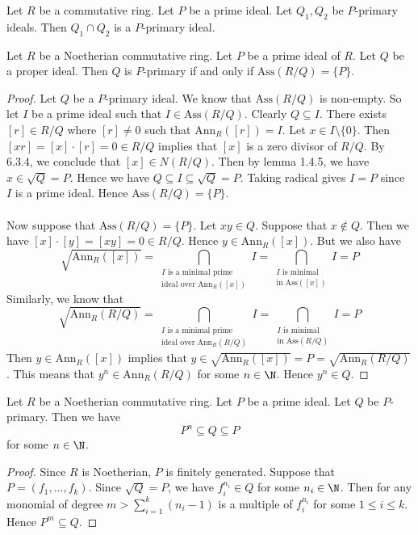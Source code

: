 \documentclass[a4paper]{article}
\begin{document}
\begin{lmm}{}{} Let $R$ be a commutative ring. Let $P$ be a prime ideal. Let $Q_1,Q_2$ be $P$-primary ideals. Then $Q_1\cap Q_2$ is a $P$-primary ideal. 
\end{lmm}

\begin{prp}{}{} Let $R$ be a Noetherian commutative ring. Let $P$ be a prime ideal of $R$. Let $Q$ be a proper ideal. Then $Q$ is $P$-primary if and only if $\text{Ass}(R/Q)=\{P\}$. \tcbline
\begin{proof}
Let $Q$ be a $P$-primary ideal. We know that $\text{Ass}(R/Q)$ is non-empty. So let $I$ be a prime ideal such that $I\in\text{Ass}(R/Q)$. Clearly $Q\subseteq I$. There exists $[r]\in R/Q$ where $[r]\neq 0$ such that $\text{Ann}_R([r])=I$. Let $x\in I\setminus\{0\}$. Then $[xr]=[x]\cdot[r]=0\in R/Q$ implies that $[x]$ is a zero divisor of $R/Q$. By 6.3.4, we conclude that $[x]\in N(R/Q)$. Then by lemma 1.4.5, we have $x\in\sqrt{Q}=P$. Hence we have $Q\subseteq I\subseteq\sqrt{Q}=P$. Taking radical gives $I=P$ since $I$ is a prime ideal. Hence $\text{Ass}(R/Q)=\{P\}$. \\~\\

Now suppose that $\text{Ass}(R/Q)=\{P\}$. Let $xy\in Q$. Suppose that $x\notin Q$. Then we have $[x]\cdot[y]=[xy]=0\in R/Q$. Hence $y\in\text{Ann}_R([x])$. But we also have $$\sqrt{\text{Ann}_R([x])}=\bigcap_{\substack{I\text{ is a minimal prime}\\\text{ideal over Ann}_R([x])}}I=\bigcap_{\substack{I\text{ is minimal}\\\text{in Ass}([x])}}I=P$$ Similarly, we know that $$\sqrt{\text{Ann}_R(R/Q)}=\bigcap_{\substack{I\text{ is a minimal prime}\\\text{ideal over Ann}_R(R/Q)}}I=\bigcap_{\substack{I\text{ is minimal}\\\text{in Ass}(R/Q)}}I=P$$ Then $y\in\text{Ann}_R([x])$ implies that $y\in\sqrt{\text{Ann}_R([x])}=P=\sqrt{\text{Ann}_R(R/Q)}$. This means that $y^n\in\text{Ann}_R(R/Q)$ for some $n\in\N$. Hence $y^n\in Q$. 
\end{proof}
\end{prp}

\begin{lmm}{}{} Let $R$ be a Noetherian commutative ring. Let $P$ be a prime ideal. Let $Q$ be $P$-primary. Then we have $$P^n\subseteq Q\subseteq P$$ for some $n\in\N$. \tcbline
\begin{proof}
Since $R$ is Noetherian, $P$ is finitely generated. Suppose that $P=(f_1,\dots,f_k)$. Since $\sqrt{Q}=P$, we have $f_i^{n_i}\in Q$ for some $n_i\in\N$. Then for any monomial of degree $m>\sum_{i=1}^k(n_i-1)$ is a multiple of $f_i^{n_i}$ for some $1\leq i\leq k$. Hence $P^m\subseteq Q$. 
\end{proof}
\end{lmm}
\end{document}
